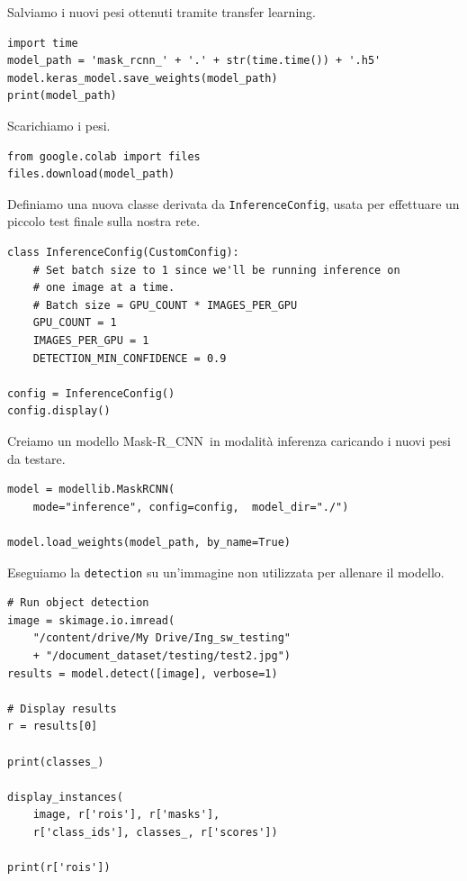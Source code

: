 \documentclass[12pt,a4paper]{article}
\newcommand{\mrcnn}{Mask-R\_CNN}
\begin{document}
Salviamo i nuovi pesi ottenuti tramite transfer learning.

\begin{verbatim}
import time
model_path = 'mask_rcnn_' + '.' + str(time.time()) + '.h5'
model.keras_model.save_weights(model_path)
print(model_path)
\end{verbatim}

Scarichiamo i pesi.

\begin{verbatim}
from google.colab import files
files.download(model_path)
\end{verbatim}

Definiamo una nuova classe derivata da \texttt{InferenceConfig}, usata
per effettuare un piccolo test finale sulla nostra rete.

\begin{verbatim}
class InferenceConfig(CustomConfig):
    # Set batch size to 1 since we'll be running inference on
    # one image at a time.
    # Batch size = GPU_COUNT * IMAGES_PER_GPU
    GPU_COUNT = 1
    IMAGES_PER_GPU = 1
    DETECTION_MIN_CONFIDENCE = 0.9

config = InferenceConfig()
config.display()
\end{verbatim}

Creiamo un modello \mrcnn\ in modalità inferenza caricando i nuovi pesi
da testare.

\begin{verbatim}
model = modellib.MaskRCNN(
    mode="inference", config=config,  model_dir="./")

model.load_weights(model_path, by_name=True)
\end{verbatim}

Eseguiamo la \texttt{detection} su un'immagine non utilizzata per
allenare il modello.

\begin{verbatim}
# Run object detection
image = skimage.io.imread(
    "/content/drive/My Drive/Ing_sw_testing"
    + "/document_dataset/testing/test2.jpg")
results = model.detect([image], verbose=1)

# Display results
r = results[0]

print(classes_)

display_instances(
    image, r['rois'], r['masks'],
    r['class_ids'], classes_, r['scores'])

print(r['rois'])
\end{verbatim}

\pagebreak
\end{document}
